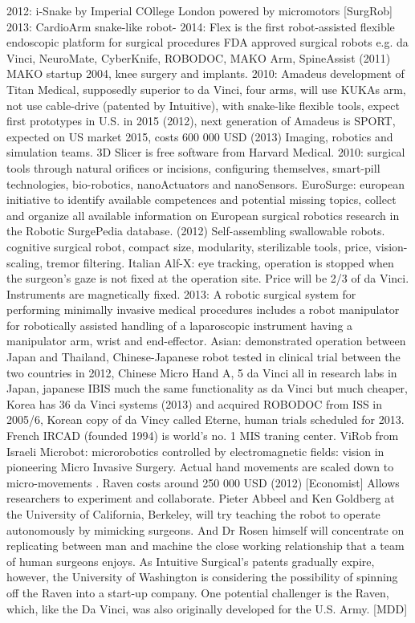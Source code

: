 2012: i-Snake by Imperial COllege London powered by micromotors [SurgRob]
2013: CardioArm snake-like robot-
2014: Flex is the first robot-assisted flexible endoscopic platform for surgical procedures
FDA approved surgical robots e.g. da Vinci, NeuroMate, CyberKnife, ROBODOC, MAKO Arm, SpineAssist (2011)
MAKO startup 2004, knee surgery and implants.
2010: Amadeus development of Titan Medical, supposedly superior to da Vinci, four arms, will use KUKAs arm, not use cable-drive (patented by Intuitive), with snake-like flexible tools, expect first prototypes in U.S. in 2015 (2012), next generation of Amadeus is SPORT, expected on US market 2015, costs 600 000 USD (2013)
Imaging, robotics and simulation teams.
3D Slicer is free software from Harvard Medical.
2010: surgical tools through natural orifices or incisions, configuring themselves, smart-pill technologies, bio-robotics, nanoActuators and nanoSensors.
EuroSurge: european initiative to identify available competences and potential missing topics, collect and organize all available information on European surgical robotics research in the Robotic SurgePedia database. (2012)
Self-assembling swallowable robots.
cognitive surgical robot, compact size, modularity, sterilizable tools, price, vision-scaling, tremor filtering.
Italian Alf-X: eye tracking, operation is stopped when the surgeon's gaze is not fixed at the operation site. Price will be 2/3 of da Vinci. Instruments are magnetically fixed.
2013: A robotic surgical system for performing minimally invasive medical procedures includes a robot manipulator for robotically assisted handling of a laparoscopic instrument having a manipulator arm, wrist and end-effector.
Asian: demonstrated operation between Japan and Thailand, Chinese-Japanese robot tested in clinical trial between the two countries in 2012, Chinese Micro Hand A, 5 da Vinci all in research labs in Japan, japanese IBIS much the same functionality as da Vinci but much cheaper, Korea has 36 da Vinci systems (2013) and acquired ROBODOC from ISS in 2005/6, Korean copy of da Vincy called Eterne, human trials scheduled for 2013.
French IRCAD (founded 1994) is world's no. 1 MIS traning center.
ViRob from Israeli Microbot: microrobotics controlled by electromagnetic fields: vision in pioneering Micro Invasive Surgery.
Actual hand movements are scaled down to micro-movements \citep{bib:intuitive_monopoly}.
Raven costs around 250 000 USD (2012) [Economist] Allows researchers to experiment and collaborate. Pieter Abbeel and Ken Goldberg at the University of California, Berkeley, will try teaching the robot to operate autonomously by mimicking surgeons. And Dr Rosen himself will concentrate on replicating between man and machine the close working relationship that a team of human surgeons enjoys. As Intuitive Surgical's patents gradually expire, however, the University of Washington is considering the possibility of spinning off the Raven into a start-up company.
One potential challenger is the Raven, which, like the Da Vinci, was also originally developed for the U.S. Army. [MDD]



